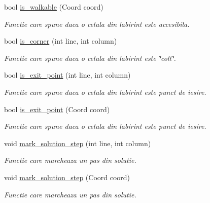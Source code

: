 \begin{DoxyCompactItemize}
bool \hyperlink{classMaze_a345eaa7ceb15067163e32c3efe04ce4c}{is\_\-walkable} (Coord coord)
\begin{DoxyCompactList}\small\item\em Functie care spune daca o celula din labirint este accesibila. \item\end{DoxyCompactList}\item 
bool \hyperlink{classMaze_af2ae53e2bf41cfa716fb1371fc3b05d5}{is\_\-corner} (int line, int column)
\begin{DoxyCompactList}\small\item\em Functie care spune daca o celula din labirint este \char`\"{}colt\char`\"{}. \item\end{DoxyCompactList}\item 
bool \hyperlink{classMaze_a979aa5dbc402c57e46109e7d88dd3de6}{is\_\-exit\_\-point} (int line, int column)
\begin{DoxyCompactList}\small\item\em Functie care spune daca o celula din labirint este punct de iesire. \item\end{DoxyCompactList}\item 
bool \hyperlink{classMaze_aabd5993906681eef8491618fb2cce4c5}{is\_\-exit\_\-point} (Coord coord)
\begin{DoxyCompactList}\small\item\em Functie care spune daca o celula din labirint este punct de iesire. \item\end{DoxyCompactList}\item 
void \hyperlink{classMaze_a258ccfd950d62359774ed00a75591eaa}{mark\_\-solution\_\-step} (int line, int column)
\begin{DoxyCompactList}\small\item\em Functie care marcheaza un pas din solutie. \item\end{DoxyCompactList}\item 
void \hyperlink{classMaze_a0b27a912b886cd33a45d53789e4f2f1b}{mark\_\-solution\_\-step} (Coord coord)
\begin{DoxyCompactList}\small\item\em Functie care marcheaza un pas din solutie. \item\end{DoxyCompactList}\end{DoxyCompactItemize}
